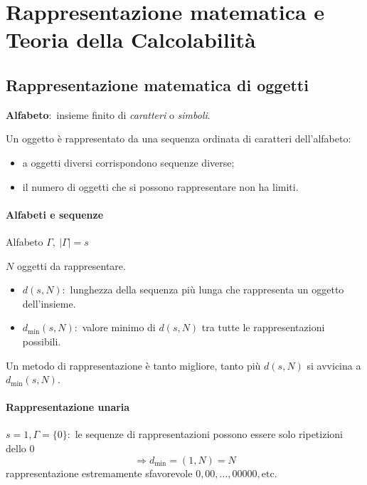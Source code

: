 \chapter{Rappresentazione matematica e Teoria della Calcolabilità}

\section{Rappresentazione matematica di oggetti}

\begin{flushleft}
    \textbf{Alfabeto}:\ insieme finito di \textit{caratteri} o \textit{simboli}.\
\end{flushleft}


\noindent Un oggetto è rappresentato da una sequenza ordinata di caratteri dell'alfabeto:
\begin{itemize}
    \item a oggetti diversi corrispondono sequenze diverse;
    \item il numero di oggetti che si possono rappresentare non ha limiti.
\end{itemize}

\subsubsection{Alfabeti e sequenze}

Alfabeto $\Gamma,\ |\Gamma| = s$

\vspace{12pt}

\noindent $N$ oggetti da rappresentare.
\begin{itemize}
    \item $d(s, N)$:\ lunghezza della sequenza più lunga che rappresenta un oggetto dell'insieme.
    \item $d_{\min}(s, N)$:\ valore minimo di $d(s, N)$ tra tutte le rappresentazioni possibili.
\end{itemize}
Un metodo di rappresentazione è tanto migliore, tanto più $d(s, N)$ si avvicina a $d_{\min}(s, N)$.\

\subsubsection{Rappresentazione unaria}

$s=1, \Gamma = \{0\}$:\ le sequenze di rappresentazioni possono essere solo ripetizioni dello 0 \[\Rightarrow d_{\min} = (1, N) = N\]
rappresentazione estremamente sfavorevole $0, 00, \dots, 00000,\mathrm{etc}.$

